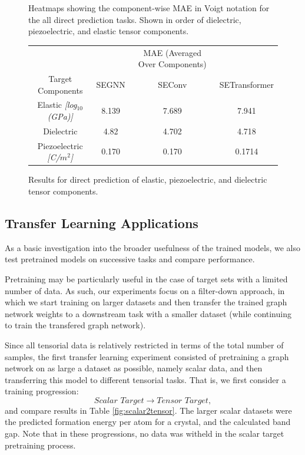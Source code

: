 \documentclass[10pt,a4paper]{article}
\begin{document}
\begin{figure}
\begin{center}
\end{center}
\caption{Heatmaps showing the component-wise MAE in Voigt notation for the all direct prediction tasks. Shown in order of dielectric, piezoelectric, and elastic tensor components. }\label{heatmaps}
\end{figure} 

\begin{figure}
\begin{tabular}{|c|ccc|}
\hline
& & MAE (Averaged Over Components)  & \\
Target Components & SEGNN & SEConv & SETransformer\\
\hline 
Elastic  \textit{[log$_10$(GPa)]}& 8.139 & 7.689 & 7.941 \\
Dielectric & 4.82 &4.702 &4.718\\
Piezoelectric \textit{[C/$m^2$]} & 0.170 & 0.170 & 0.1714\\
\hline
\end{tabular}
\caption{Results for direct prediction of elastic, piezoelectric, and dielectric tensor components. }\label{direct}
\end{figure}


\subsection{Transfer Learning Applications}
As a basic investigation into the broader usefulness of the trained models, we also test pretrained models on successive tasks and compare performance.

Pretraining may be particularly useful in the case of target sets with a limited number of data. As such, our experiments focus on a filter-down approach, in which we start training on larger datasets and then transfer the trained graph network weights to a downstream task with a smaller dataset (while continuing to train the transfered graph network).

Since all tensorial data is relatively restricted in terms of the total number of samples, the first transfer learning experiment consisted of pretraining a graph network on as large a dataset as possible, namely scalar data, and then transferring this model to different tensorial tasks. That is, we first consider a training progression:
$$
\textit{Scalar Target} \rightarrow \textit{Tensor Target},
$$
and compare results in Table \ref{fig:scalar2tensor}. The larger scalar datasets were the predicted formation energy per atom for a crystal, and the calculated band gap. Note that in these progressions, no data was witheld in the scalar target pretraining process.
\end{document}
